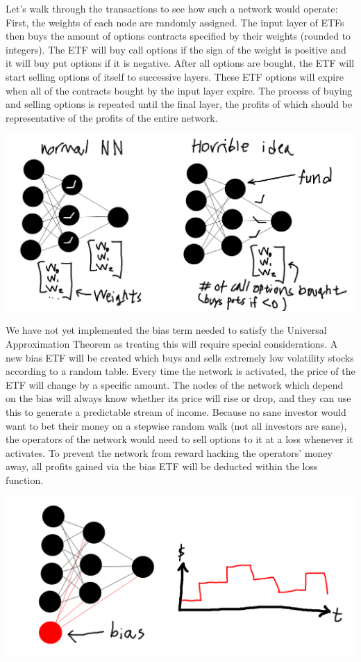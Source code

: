 \documentclass[12pt]{article}
\begin{document}
Let's walk through the transactions to see how such a network would operate: First, the weights of each node are randomly assigned. The input layer of ETFs then buys the amount of options contracts specified by their weights (rounded to integers). The ETF will buy call options if the sign of the weight is positive and it will buy put options if it is negative. After all options are bought, the ETF will start selling options of itself to successive layers. These ETF options will expire when all of the contracts bought by the input layer expire. The process of buying and selling options is repeated until the final layer, the profits of which should be representative of the profits of the entire network.

\includegraphics[scale=0.4]{./network.png}
\linebreak

We have not yet implemented the bias term needed to satisfy the Universal Approximation Theorem as treating this will require special considerations. A new bias ETF will be created which buys and sells extremely low volatility stocks according to a random table. Every time the network is activated, the price of the ETF will change by a specific amount. The nodes of the network which depend on the bias will always know whether its price will rise or drop, and they can use this to generate a predictable stream of income. Because no sane investor would want to bet their money on a stepwise random walk (not all investors are sane), the operators of the network would need to sell options to it at a loss whenever it activates. To prevent the network from reward hacking the operators' money away, all profits gained via the bias ETF will be deducted within the loss function.
\linebreak

\includegraphics[scale=0.4]{./bias.png}
\end{document}
